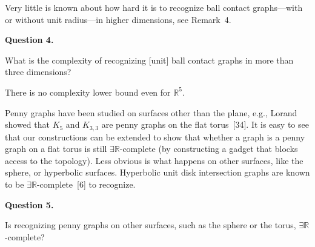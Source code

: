 \documentclass{article}
\begin{document}
Very little is known about how hard it is to recognize ball contact graphs---with or without unit radius---in higher dimensions, see Remark~4.
\par\medskip\noindent\textbf{Question 4.} \begin{itshape}
    What is the complexity of recognizing [unit] ball contact graphs in more than three dimensions?
\end{itshape}\par\medskip
There is no complexity lower bound even for $\ensuremath{\mathbb{R}}^5$.

Penny graphs have been studied on surfaces other than the plane, e.g., Lorand showed that $K_5$ and $K_{3,3}$ are penny graphs on the flat torus~[34]. It is easy to see that our constructions can be extended to show that whether a graph is a penny graph on a flat torus is still \ensuremath{\exists\mathbb{R}}-complete (by constructing a gadget that blocks access to the topology). Less obvious is what happens on other surfaces, like the sphere, or hyperbolic surfaces. Hyperbolic unit disk intersection graphs are known to be \ensuremath{\exists\mathbb{R}}-complete~[6]
to recognize.
\par\medskip\noindent\textbf{Question 5.} \begin{itshape}
    Is recognizing penny graphs on other surfaces, such as the sphere or the torus, \ensuremath{\exists\mathbb{R}}-complete?
\end{itshape}\par\medskip
\end{document}
